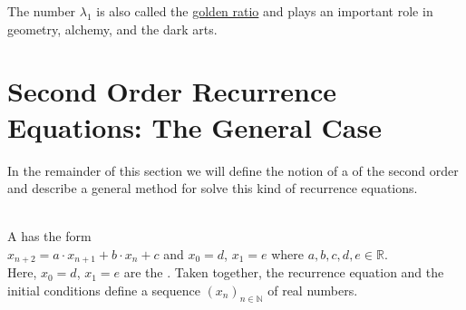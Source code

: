 \remark 
The number $\lambda_1$ is also called the \href{https://en.wikipedia.org/wiki/Golden_ratio}{golden ratio} 
and plays an important role in geometry, alchemy, and the dark arts. \eoxs

\section{Second Order Recurrence Equations: The General Case}
In the remainder of this section we will define the notion of a 
of the second order and describe a general method for solve this kind of recurrence equations.

\begin{Definition} \hspace*{\fill} \\
  A 
  has the form
  \\[0.2cm]
  \hspace*{1.3cm}
  $x_{n+2} = a \cdot x_{n+1} + b \cdot x_n + c$ \quad and \quad $x_0 = d$, $x_1 = e$
  \quad where $a, b, c, d, e \in \mathbb{R}$.
  \\[0.2cm]
  Here, $x_0 = d$, $x_1 = e$ are the .  Taken together, the recurrence
  equation and the initial conditions define a sequence $(x_n)_{n\in\mathbb{N}}$ of real numbers.  \eox
\end{Definition}

